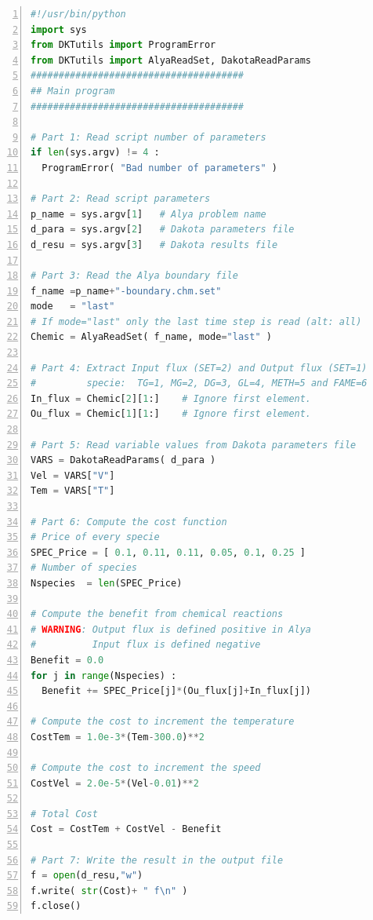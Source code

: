 \documentclass[12pt,a4paper,article]{memoir}
\begin{document}
\begin{lstlisting}[style=MyCodeStyle,language=Python,numbers=left]
#!/usr/bin/python
import sys
from DKTutils import ProgramError
from DKTutils import AlyaReadSet, DakotaReadParams
######################################
## Main program
######################################

# Part 1: Read script number of parameters
if len(sys.argv) != 4 :
  ProgramError( "Bad number of parameters" )

# Part 2: Read script parameters
p_name = sys.argv[1]   # Alya problem name
d_para = sys.argv[2]   # Dakota parameters file
d_resu = sys.argv[3]   # Dakota results file

# Part 3: Read the Alya boundary file
f_name =p_name+"-boundary.chm.set"
mode   = "last"
# If mode="last" only the last time step is read (alt: all)
Chemic = AlyaReadSet( f_name, mode="last" )

# Part 4: Extract Input flux (SET=2) and Output flux (SET=1)
#         specie:  TG=1, MG=2, DG=3, GL=4, METH=5 and FAME=6
In_flux = Chemic[2][1:]    # Ignore first element.
Ou_flux = Chemic[1][1:]    # Ignore first element.

# Part 5: Read variable values from Dakota parameters file
VARS = DakotaReadParams( d_para )
Vel = VARS["V"]
Tem = VARS["T"]

# Part 6: Compute the cost function
# Price of every specie
SPEC_Price = [ 0.1, 0.11, 0.11, 0.05, 0.1, 0.25 ]
# Number of species
Nspecies  = len(SPEC_Price)

# Compute the benefit from chemical reactions
# WARNING: Output flux is defined positive in Alya
#          Input flux is defined negative
Benefit = 0.0
for j in range(Nspecies) :
  Benefit += SPEC_Price[j]*(Ou_flux[j]+In_flux[j])

# Compute the cost to increment the temperature
CostTem = 1.0e-3*(Tem-300.0)**2

# Compute the cost to increment the speed
CostVel = 2.0e-5*(Vel-0.01)**2

# Total Cost
Cost = CostTem + CostVel - Benefit

# Part 7: Write the result in the output file
f = open(d_resu,"w")
f.write( str(Cost)+ " f\n" )
f.close()
\end{lstlisting}
\end{document}
